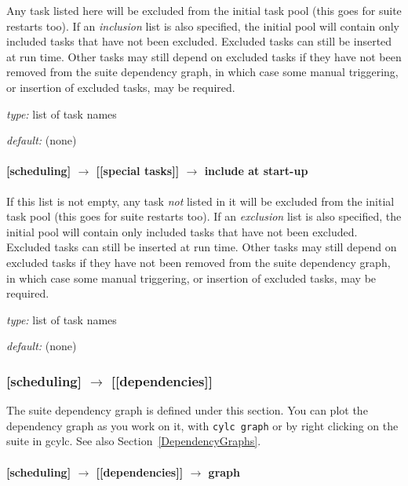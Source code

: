 Any task listed here will be excluded from the initial task pool (this
goes for suite restarts too). If an {\em inclusion} list is also
specified, the initial pool will contain only included tasks that have
not been excluded. Excluded tasks can still be inserted at run time.
Other tasks may still depend on excluded tasks if they have not been
removed from the suite dependency graph, in which case some manual
triggering, or insertion of excluded tasks, may be required.

\begin{myitemize}
    \item {\em type:} list of task names
    \item {\em default:} (none)
\end{myitemize}

\paragraph[include at start-up]{[scheduling] $\rightarrow$ [[special tasks]] $\rightarrow$ include at start-up}
\label{IASU}

If this list is not empty, any task {\em not} listed in it will be
excluded from the initial task pool (this goes for suite restarts too).
If an {\em exclusion} list is also specified, the initial pool will
contain only included tasks that have not been excluded. Excluded tasks
can still be inserted at run time. Other tasks may still depend on
excluded tasks if they have not been removed from the suite dependency
graph, in which case some manual triggering, or insertion of excluded 
tasks, may be required.

\begin{myitemize}
    \item {\em type:} list of task names
    \item {\em default:} (none)
\end{myitemize}

\subsubsection[{[[}dependencies{]]}]{[scheduling] $\rightarrow$ [[dependencies]]}

The suite dependency graph is defined under this section.  You can plot
the dependency graph as you work on it, with \lstinline=cylc graph= or
by right clicking on the suite in gcylc.  See also 
Section~\ref{DependencyGraphs}.

\paragraph[graph]{ [scheduling] $\rightarrow$ [[dependencies]] $\rightarrow$ graph }


